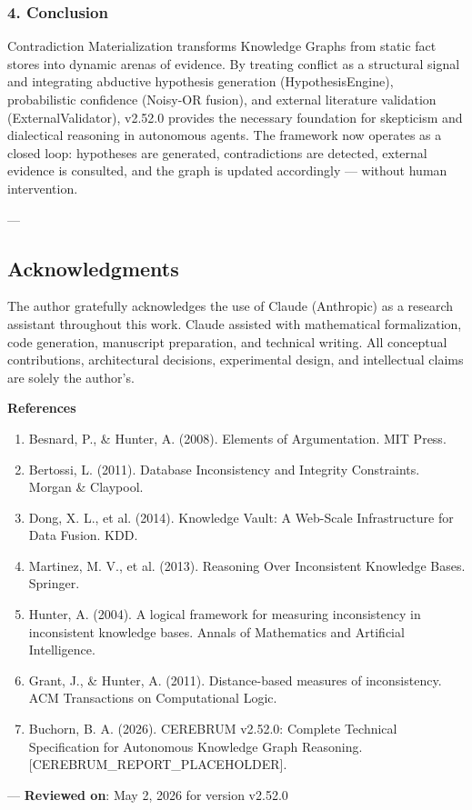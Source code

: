 \subsubsection{4. Conclusion}
Contra\-diction Materi\-alization transforms Knowledge Graphs from static fact stores into dynamic arenas of evidence. By treating conflict as a structural signal and integrating abductive hypothesis generation (HypothesisEngine), proba\-bilistic confidence (Noisy-OR fusion), and external literature validation (ExternalValidator), v2.52.0 provides the necessary foundation for skepticism and dialectical reasoning in autonomous agents. The framework now operates as a closed loop: hypotheses are generated, contr\-adictions are detected, external evidence is consulted, and the graph is updated accordingly — without human inter\-vention.

---
\subsection{Acknow\-ledgments}

The author gratefully ackno\-wledges the use of Claude (Anthropic) as a research assistant throughout this work. Claude assisted with mathe\-matical forma\-lization, code generation, manuscript preparation, and technical writing. All conceptual contr\-ibutions, archi\-tectural decisions, exper\-imental design, and intel\-lectual claims are solely the author's.

\textbf{References}
\begin{enumerate}
\item Besnard, P., \& Hunter, A. (2008). Elements of Argume\-ntation. MIT Press.
\item Bertossi, L. (2011). Database Incons\-istency and Integrity Constraints. Morgan \& Claypool.
\item Dong, X. L., et al. (2014). Knowledge Vault: A Web-Scale Infras\-tructure for Data Fusion. KDD.
\item Martinez, M. V., et al. (2013). Reasoning Over Incons\-istent Knowledge Bases. Springer.
\item Hunter, A. (2004). A logical framework for measuring incon\-sistency in incon\-sistent knowledge bases. Annals of Mathematics and Artificial Intell\-igence.
\item Grant, J., \& Hunter, A. (2011). Distance-based measures of incon\-sistency. ACM Transa\-ctions on Comput\-ational Logic.
\item Buchorn, B. A. (2026). CEREBRUM v2.52.0: Complete Technical Specif\-ication for Autonomous Knowledge Graph Reasoning. [CEREBRUM\_REPORT\_PLACEHOLDER].

\end{enumerate}
---
\textbf{Reviewed on}: May 2, 2026 for version v2.52.0
